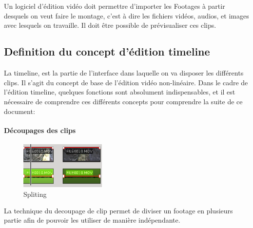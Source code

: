 Un logiciel d'édition vidéo doit permettre d'importer les Footages
 à partir desquels on veut faire le montage, c'est
à dire les fichiers vidéos, audios, et images avec lesquels on
travaille. Il doit être possible de prévisualiser ces clips.

\subsection{Definition du concept d'édition timeline}

\paragraph{}

La timeline, est la partie de l'interface dans laquelle on va disposer
les différents clips. Il s'agit du concept de base de l'édition vidéo
non-linéaire.  Dans le cadre de l'édition timeline, quelques fonctions
sont absolument indispensables, et il est nécessaire de comprendre ces
différents concepts pour comprendre la suite de ce document:

\paragraph{Découpages des clips}

\begin{figure}

  \vspace{-20pt} \begin{center}

    \includegraphics[width=0.38\textwidth]{images/splited}

  \end{center} \vspace{-20pt} \caption{Spliting} \label{Yes}

  \vspace{-10pt}

\end{figure}

La technique du decoupage de clip permet de diviser un footage en
plusieurs partie afin de pouvoir les utiliser de manière indépendante.

